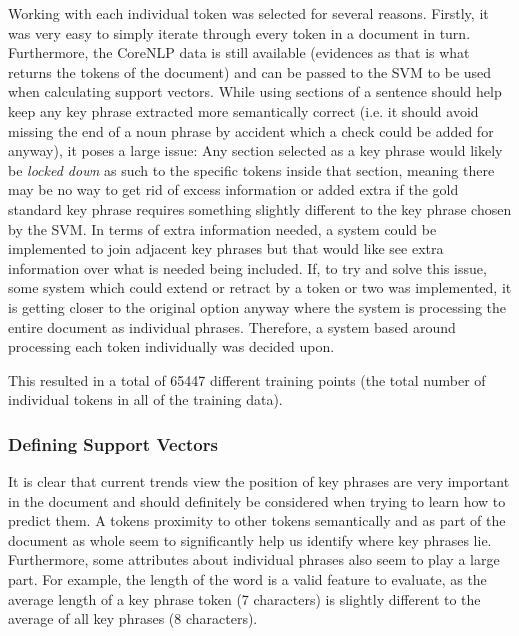 Working with each individual token was selected for several reasons. Firstly, it was very easy to simply iterate through every token in a document in turn. Furthermore, the CoreNLP data is still available (evidences as that is what returns the tokens of the document) and can be passed to the SVM to be used when calculating support vectors. While using sections of a sentence should help keep any key phrase extracted more semantically correct (i.e. it should avoid missing the end of a noun phrase by accident which a check could be added for anyway), it poses a large issue: Any section selected as a key phrase would likely be \textit{locked down} as such to the specific tokens inside that section, meaning there may be no way to get rid of excess information or added extra if the gold standard key phrase requires something slightly different to the key phrase chosen by the SVM. In terms of extra information needed, a system could be implemented to join adjacent key phrases but that would like see extra information over what is needed being included. If, to try and solve this issue, some system which could extend or retract by a token or two was implemented, it is getting closer to the original option anyway where the system is processing the entire document as individual phrases. Therefore, a system based around processing each token individually was decided upon.

This resulted in a total of 65447 different training points (the total number of individual tokens in all of the training data).

\subsubsection*{Defining Support Vectors}
It is clear that current trends view the position of key phrases are very important in the document and should definitely be considered when trying to learn how to predict them. A tokens proximity to other tokens semantically and as part of the document as whole seem to significantly help us identify where key phrases lie. Furthermore, some attributes about individual phrases also seem to play a large part. For example, the length of the word is a valid feature to evaluate, as the average length of a key phrase token (7 characters) is slightly different to the average of all key phrases (8 characters). 

